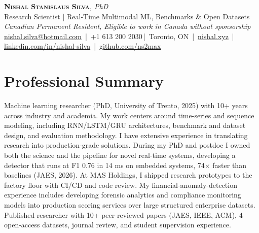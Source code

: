 \documentclass[11pt]{article}
\makeatletter
\newcommand{\cvName}{Nishal Stanislaus Silva}
\newcommand{\cvEmail}{nishal.silva@hotmail.com}
\newcommand{\cvPhone}{+1 613 200 2030}
\newcommand{\cvCity}{Toronto, ON}
\newcommand{\cvSite}{https://nishal.xyz}
\newcommand{\cvLinkedIn}{https://www.linkedin.com/in/nishal-silva}
\newcommand{\cvGitHub}{https://github.com/ns2max}
\newcommand{\cvStatus}{Canadian Permanent Resident, Eligible to work in Canada without sponsorship}
\newcommand{\cvTagline}{Research Scientist | Real-Time Multimodal ML, Benchmarks \& Open Datasets}
\makeatother
\begin{document}
\pagestyle{empty}
\begin{center}
    {\LARGE \scshape \textbf{\cvName}}{\large \textit{, PhD}}\\[1pt]
    {\small \cvTagline}\\[1pt]
    {\footnotesize\textit{\cvStatus}}\\[1pt]
    {\small
    \href{mailto:\cvEmail}{\cvEmail} \,|\, \cvPhone \,|\, \cvCity
    \,|\, \href{\cvSite}{nishal.xyz} \,|\, \href{\cvLinkedIn}{linkedin.com/in/nishal-silva}
    \,|\, \href{\cvGitHub}{github.com/ns2max}}
\end{center}

\section*{Professional Summary}



Machine learning researcher (PhD, University of Trento, 2025) with 10+ years across industry and academia. My work centers around time-series and sequence modeling, including RNN/LSTM/GRU architectures, benchmark and dataset design, and evaluation methodology. I have extensive experience in translating research into production-grade solutions. During my PhD and postdoc I owned both the science and the pipeline for novel real-time systems, developing a detector that runs at F1 0.76 in 14 ms on embedded systems, 74$\times$ faster than baselines (JAES, 2026). At MAS Holdings, I shipped research prototypes to the factory floor with CI/CD and code review. My financial-anomaly-detection experience includes developing forensic analytics and compliance monitoring models into production scoring services over large structured enterprise datasets. Published researcher with 10+ peer-reviewed papers (JAES, IEEE, ACM), 4 open-access datasets, journal review, and student supervision experience.
\end{document}
